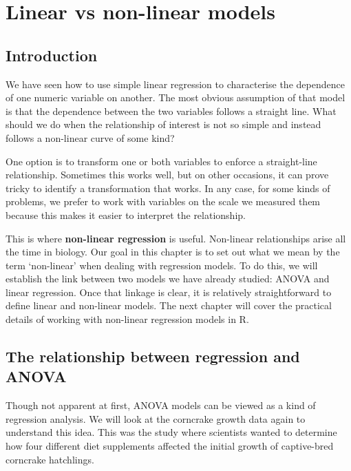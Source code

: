 \documentclass[
]{book}
\begin{document}
\hypertarget{types-of-models}{%
\chapter{Linear vs non-linear models}\label{types-of-models}}

\hypertarget{introduction-5}{%
\section{Introduction}\label{introduction-5}}

We have seen how to use simple linear regression to characterise the dependence of one numeric variable on another. The most obvious assumption of that model is that the dependence between the two variables follows a straight line. What should we do when the relationship of interest is not so simple and instead follows a non-linear curve of some kind?

One option is to transform one or both variables to enforce a straight-line relationship. Sometimes this works well, but on other occasions, it can prove tricky to identify a transformation that works. In any case, for some kinds of problems, we prefer to work with variables on the scale we measured them because this makes it easier to interpret the relationship.

This is where \textbf{non-linear regression} is useful. Non-linear relationships arise all the time in biology. Our goal in this chapter is to set out what we mean by the term `non-linear' when dealing with regression models. To do this, we will establish the link between two models we have already studied: ANOVA and linear regression. Once that linkage is clear, it is relatively straightforward to define linear and non-linear models. The next chapter will cover the practical details of working with non-linear regression models in R.

\hypertarget{the-relationship-between-regression-and-anova}{%
\section{The relationship between regression and ANOVA}\label{the-relationship-between-regression-and-anova}}

Though not apparent at first, ANOVA models can be viewed as a kind of regression analysis. We will look at the corncrake growth data again to understand this idea. This was the study where scientists wanted to determine how four different diet supplements affected the initial growth of captive-bred corncrake hatchlings.
\end{document}

